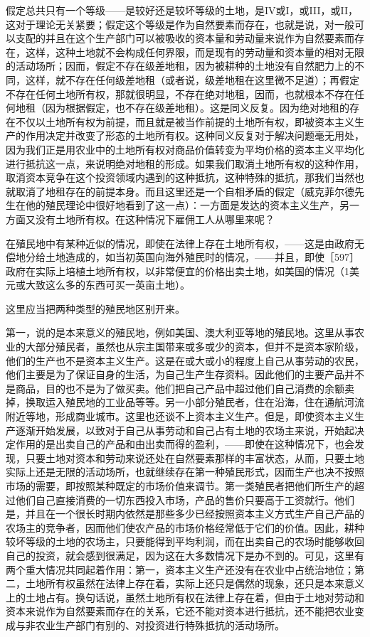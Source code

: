 假定总共只有一个等级——是较好还是较坏等级的土地，是IV或I，或III，或II，这对于理论无关紧要；假定这个等级是作为自然要素而存在，也就是说，对一般可以支配的并且在这个生产部门可以被吸收的资本量和劳动量来说作为自然要素而存在，这样，这种土地就不会构成任何界限，而是现有的劳动量和资本量的相对无限的活动场所；因而，假定不存在级差地租，因为被耕种的土地没有自然肥力上的不同，这样，就不存在任何级差地租（或者说，级差地租在这里微不足道）；再假定不存在任何土地所有权，那就很明显，不存在绝对地租，因而，也就根本不存在任何地租（因为根据假定，也不存在级差地租）。这是同义反复。因为绝对地租的存在不仅以土地所有权为前提，而且就是被当作前提的土地所有权，即被资本主义生产的作用决定并改变了形态的土地所有权。这种同义反复对于解决问题毫无用处，因为我们正是用农业中的土地所有权对商品价值转变为平均价格的资本主义平均化进行抵抗这一点，来说明绝对地租的形成。如果我们取消土地所有权的这种作用，取消资本竞争在这个投资领域内遇到的这种抵抗，这种特殊的抵抗，那我们当然也就取消了地租存在的前提本身。而且这里还是一个自相矛盾的假定（威克菲尔德先生在他的殖民理论中很好地看到了这一点）：一方面是发达的资本主义生产，另一方面又没有土地所有权。在这种情况下雇佣工人从哪里来呢？

在殖民地中有某种近似的情况，即使在法律上存在土地所有权，——这是由政府无偿地分给土地造成的，如当初英国向海外殖民时的情况，——并且，即使［597］政府在实际上培植土地所有权，以非常便宜的价格出卖土地，如美国的情况（1美元或大致这么多的东西可买一英亩土地）。

这里应当把两种类型的殖民地区别开来。

第一，说的是本来意义的殖民地，例如美国、澳大利亚等地的殖民地。这里从事农业的大部分殖民者，虽然也从宗主国带来或多或少的资本，但并不是资本家阶级，他们的生产也不是资本主义生产。这是在或大或小的程度上自己从事劳动的农民，他们主要是为了保证自身的生活，为自己生产生存资料。因此他们的主要产品并不是商品，目的也不是为了做买卖。他们把自己产品中超过他们自己消费的余额卖掉，换取运入殖民地的工业品等等。另一小部分殖民者，住在沿海，住在通航河流附近等地，形成商业城市。这里也还谈不上资本主义生产。但是，即使资本主义生产逐渐开始发展，以致对于自己从事劳动和自己占有土地的农场主来说，开始起决定作用的是出卖自己的产品和由出卖而得的盈利，——即使在这种情况下，也会发现，只要土地对资本和劳动来说还处在自然要素那样的丰富状态，从而，只要土地实际上还是无限的活动场所，也就继续存在第一种殖民形式，因而生产也决不按照市场的需要，即按照某种既定的市场价值来调节。第一类殖民者把他们所生产的超过他们自己直接消费的一切东西投入市场，产品的售价只要高于工资就行。他们是，并且在一个很长时期内依然是那些多少已经按照资本主义方式生产自己产品的农场主的竞争者，因而他们使农产品的市场价格经常低于它们的价值。因此，耕种较坏等级的土地的农场主，只要能得到平均利润，而在出卖自己的农场时能够收回自己的投资，就会感到很满足，因为这在大多数情况下是办不到的。可见，这里有两个重大情况共同起着作用：第一，资本主义生产还没有在农业中占统治地位；第二，土地所有权虽然在法律上存在着，实际上还只是偶然的现象，还只是本来意义上的土地占有。换句话说，虽然土地所有权在法律上存在着，但由于土地对劳动和资本来说作为自然要素而存在的关系，它还不能对资本进行抵抗，还不能把农业变成与非农业生产部门有别的、对投资进行特殊抵抗的活动场所。

